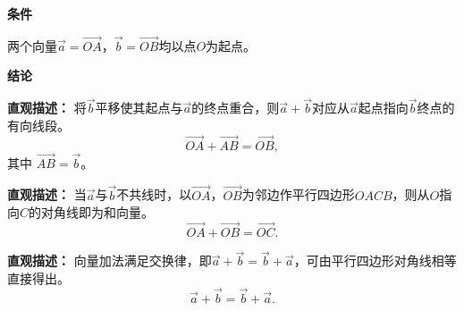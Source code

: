 \begin{statementbox}
	\textbf{\textcolor{CStatement}{条件}}
	\begin{description}[style=nextline, leftmargin=2.8em, labelsep=0.5em, itemsep=0.35em]
		\item[\textbf{\textcolor{CStatement}{条件1（公共起点）：}}] 两个向量$\vec{a}=\overrightarrow{OA}$，$\vec{b}=\overrightarrow{OB}$均以点$O$为起点。
	\end{description}

	\textbf{\textcolor{CStatement}{结论}}
	\begin{description}[style=nextline, leftmargin=2.8em, labelsep=0.5em, itemsep=0.45em]
		\item[\textbf{\textcolor{CStatement}{结论一（三角形法则）：}}]
			\textbf{\textcolor{CStatement}{直观描述：}}
			将$\vec{b}$平移使其起点与$\vec{a}$的终点重合，则$\vec{a}+\vec{b}$对应从$\vec{a}$起点指向$\vec{b}$终点的有向线段。
			\[
				\overrightarrow{OA}+\overrightarrow{AB}=\overrightarrow{OB},
			\]
			其中 $\overrightarrow{AB}=\vec{b}$。

		\item[\textbf{\textcolor{CStatement}{结论二（平行四边形法则）：}}]
			\textbf{\textcolor{CStatement}{直观描述：}}
			当$\vec{a}$与$\vec{b}$不共线时，以$\overrightarrow{OA}$，$\overrightarrow{OB}$为邻边作平行四边形$OACB$，则从$O$指向$C$的对角线即为和向量。
			\[
				\overrightarrow{OA}+\overrightarrow{OB}=\overrightarrow{OC}.
			\]
		\item[\textbf{\textcolor{CStatement}{常见变形（交换律）：}}]
			\textbf{\textcolor{CStatement}{直观描述：}}
			向量加法满足交换律，即$\vec{a}+\vec{b}=\vec{b}+\vec{a}$，可由平行四边形对角线相等直接得出。
			\[
				\vec{a}+\vec{b}=\vec{b}+\vec{a}.
			\]
	\end{description}
\end{statementbox}
